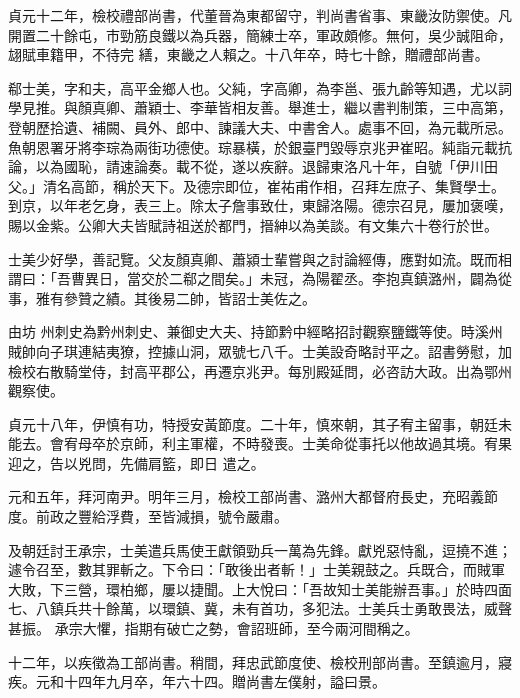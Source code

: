 \begin{pinyinscope}
 貞元十二年，檢校禮部尚書，代董晉為東都留守，判尚書省事、東畿汝防禦使。凡開置二十餘屯，市勁筋良鐵以為兵器，簡練士卒，軍政頗修。無何，吳少誠阻命，翃賦車籍甲，不待完
 繕，東畿之人賴之。十八年卒，時七十餘，贈禮部尚書。



 郗士美，字和夫，高平金鄉人也。父純，字高卿，為李邕、張九齡等知遇，尤以詞學見推。與顏真卿、蕭穎士、李華皆相友善。舉進士，繼以書判制策，三中高第，登朝歷拾遺、補闕、員外、郎中、諫議大夫、中書舍人。處事不回，為元載所忌。魚朝恩署牙將李琮為兩街功德使。琮暴橫，於銀臺門毀辱京兆尹崔昭。純詣元載抗論，以為國恥，請速論奏。載不從，遂以疾辭。退歸東洛凡十年，自號「伊川田
 父。」清名高節，稱於天下。及德宗即位，崔祐甫作相，召拜左庶子、集賢學士。到京，以年老乞身，表三上。除太子詹事致仕，東歸洛陽。德宗召見，屢加褒嘆，賜以金紫。公卿大夫皆賦詩祖送於都門，搢紳以為美談。有文集六十卷行於世。



 士美少好學，善記覽。父友顏真卿、蕭潁士輩嘗與之討論經傳，應對如流。既而相謂曰：「吾曹異日，當交於二郗之間矣。」未冠，為陽翟丞。李抱真鎮潞州，闢為從事，雅有參贊之績。其後易二帥，皆詔士美佐之。



 由坊
 州刺史為黔州刺史、兼御史大夫、持節黔中經略招討觀察鹽鐵等使。時溪州賊帥向子琪連結夷獠，控據山洞，眾號七八千。士美設奇略討平之。詔書勞慰，加檢校右散騎堂侍，封高平郡公，再遷京兆尹。每別殿延問，必咨訪大政。出為鄂州觀察使。



 貞元十八年，伊慎有功，特授安黃節度。二十年，慎來朝，其子宥主留事，朝廷未能去。會宥母卒於京師，利主軍權，不時發喪。士美命從事托以他故過其境。宥果迎之，告以兇問，先備肩籃，即日
 遣之。



 元和五年，拜河南尹。明年三月，檢校工部尚書、潞州大都督府長史，充昭義節度。前政之豐給浮費，至皆減損，號令嚴肅。



 及朝廷討王承宗，士美遣兵馬使王獻領勁兵一萬為先鋒。獻兇惡恃亂，逗撓不進；遽令召至，數其罪斬之。下令曰：「敢後出者斬！」士美親鼓之。兵既合，而賊軍大敗，下三營，環柏鄉，屢以捷聞。上大悅曰：「吾故知士美能辦吾事。」於時四面七、八鎮兵共十餘萬，以環鎮、冀，未有首功，多犯法。士美兵士勇敢畏法，威聲甚振。
 承宗大懼，指期有破亡之勢，會詔班師，至今兩河間稱之。



 十二年，以疾徵為工部尚書。稍間，拜忠武節度使、檢校刑部尚書。至鎮逾月，寢疾。元和十四年九月卒，年六十四。贈尚書左僕射，謚曰景。




\end{pinyinscope}
